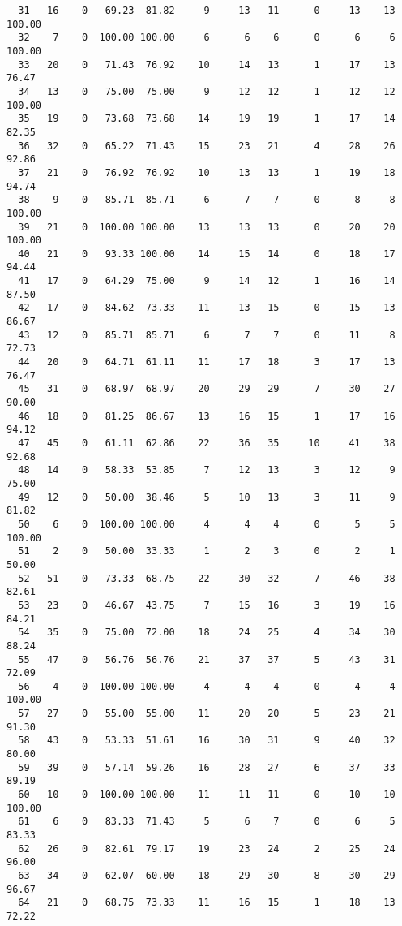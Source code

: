 \begin{verbatim}
  31   16    0   69.23  81.82     9     13   11      0     13    13   100.00
  32    7    0  100.00 100.00     6      6    6      0      6     6   100.00
  33   20    0   71.43  76.92    10     14   13      1     17    13    76.47
  34   13    0   75.00  75.00     9     12   12      1     12    12   100.00
  35   19    0   73.68  73.68    14     19   19      1     17    14    82.35
  36   32    0   65.22  71.43    15     23   21      4     28    26    92.86
  37   21    0   76.92  76.92    10     13   13      1     19    18    94.74
  38    9    0   85.71  85.71     6      7    7      0      8     8   100.00
  39   21    0  100.00 100.00    13     13   13      0     20    20   100.00
  40   21    0   93.33 100.00    14     15   14      0     18    17    94.44
  41   17    0   64.29  75.00     9     14   12      1     16    14    87.50
  42   17    0   84.62  73.33    11     13   15      0     15    13    86.67
  43   12    0   85.71  85.71     6      7    7      0     11     8    72.73
  44   20    0   64.71  61.11    11     17   18      3     17    13    76.47
  45   31    0   68.97  68.97    20     29   29      7     30    27    90.00
  46   18    0   81.25  86.67    13     16   15      1     17    16    94.12
  47   45    0   61.11  62.86    22     36   35     10     41    38    92.68
  48   14    0   58.33  53.85     7     12   13      3     12     9    75.00
  49   12    0   50.00  38.46     5     10   13      3     11     9    81.82
  50    6    0  100.00 100.00     4      4    4      0      5     5   100.00
  51    2    0   50.00  33.33     1      2    3      0      2     1    50.00
  52   51    0   73.33  68.75    22     30   32      7     46    38    82.61
  53   23    0   46.67  43.75     7     15   16      3     19    16    84.21
  54   35    0   75.00  72.00    18     24   25      4     34    30    88.24
  55   47    0   56.76  56.76    21     37   37      5     43    31    72.09
  56    4    0  100.00 100.00     4      4    4      0      4     4   100.00
  57   27    0   55.00  55.00    11     20   20      5     23    21    91.30
  58   43    0   53.33  51.61    16     30   31      9     40    32    80.00
  59   39    0   57.14  59.26    16     28   27      6     37    33    89.19
  60   10    0  100.00 100.00    11     11   11      0     10    10   100.00
  61    6    0   83.33  71.43     5      6    7      0      6     5    83.33
  62   26    0   82.61  79.17    19     23   24      2     25    24    96.00
  63   34    0   62.07  60.00    18     29   30      8     30    29    96.67
  64   21    0   68.75  73.33    11     16   15      1     18    13    72.22

\end{verbatim}
